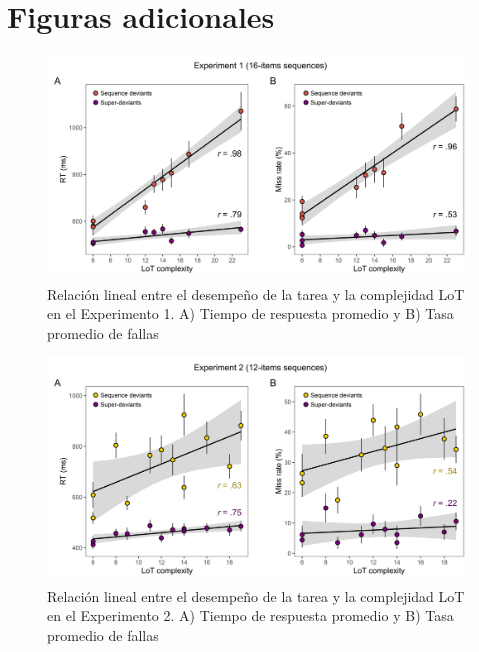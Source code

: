 \section{Figuras adicionales}

\begin{figure}[t!]
      \includegraphics[scale=0.8]{figuras/plosbio/journal.pcbi.1008598.s001.png}
      \centering
      \caption{Relación lineal entre el desempeño de la tarea y la complejidad LoT en el Experimento 1. A) Tiempo de respuesta promedio y B) Tasa promedio de fallas}
      \label{PlosBIO-S1}
\end{figure}

\begin{figure}[t!]
      \includegraphics[scale=0.8]{figuras/plosbio/journal.pcbi.1008598.s002.png}
      \centering
      \caption{Relación lineal entre el desempeño de la tarea y la complejidad LoT en el Experimento 2. A) Tiempo de respuesta promedio y B) Tasa promedio de fallas}
      \label{PlosBIO-S2}
\end{figure}


